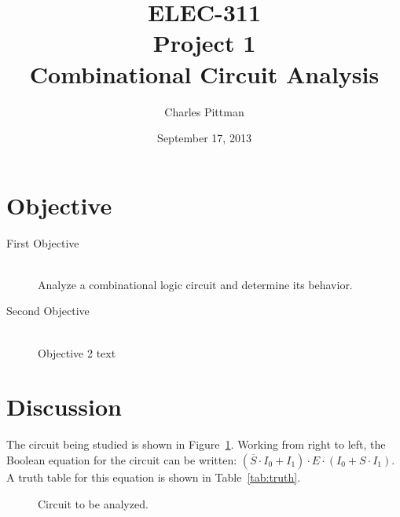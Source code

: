 \documentclass{article}
\author{Charles Pittman}
\title{ELEC-311\\ Project 1\\ Combinational Circuit Analysis}
\date{September 17, 2013}
\begin{document}
\maketitle %

\pagebreak


\renewcommand{\labelenumi}{\alph{enumi}.}

\section{Objective}
\label{sec:objective}

 \begin{description}
 \item[First Objective] \hfill \\
   Analyze a combinational logic circuit and determine its behavior.
 \item[Second Objective] \hfill \\
   Objective 2 text
 \end{description}

\section{Discussion}
\label{sec:procedure}

The circuit being studied is shown in Figure~\ref{fig:circuit}.
Working from right to left, the Boolean equation for the circuit can
be written: $(\overline{S} \cdot I_0 + I_1) \cdot E \cdot (I_0 + S
\cdot I_1)$.  A truth table for this equation is shown in Table~\ref{tab:truth}.


\begin{figure}[h]
  \centering
  \caption{Circuit to be analyzed.}
  \label{fig:circuit}
\end{figure}
\end{document}
